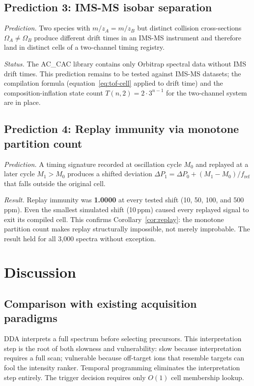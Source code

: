 \documentclass[twocolumn,10pt,a4paper]{article}
\theoremstyle{thmstyle}
\theoremstyle{definition}
\theoremstyle{remark}
\newcommand{\DP}{\Delta P}
\newcommand{\fref}{f_{\mathrm{ref}}}
\begin{document}
\subsection{Prediction 3: IMS-MS isobar separation}

\emph{Prediction.} Two species with $m/z_A = m/z_B$ but distinct
collision cross-sections $\Omega_A \neq \Omega_B$ produce different
drift times in an IMS-MS instrument and therefore land in distinct cells
of a two-channel timing registry.

\emph{Status.} The AC\_CAC library contains only Orbitrap spectral data
without IMS drift times. This prediction remains to be tested against
IMS-MS datasets; the compilation formula (equation~\eqref{eq:tof-cell}
applied to drift time) and the composition-inflation state count
$T(n,2) = 2 \cdot 3^{n-1}$ for the two-channel system are in place.

\subsection{Prediction 4: Replay immunity via monotone partition count}

\emph{Prediction.} A timing signature recorded at oscillation cycle $M_0$
and replayed at a later cycle $M_1 > M_0$ produces a shifted deviation
$\DP_1 = \DP_0 + (M_1 - M_0)/\fref$ that falls outside the original cell.

\emph{Result.} Replay immunity was \textbf{1.0000} at every tested shift
(10, 50, 100, and 500\,ppm). Even the smallest simulated shift (10\,ppm)
caused every replayed signal to exit its compiled cell. This confirms
Corollary~\ref{cor:replay}: the monotone partition count makes replay
structurally impossible, not merely improbable. The result held for all
3{,}000 spectra without exception.

\section{Discussion}
\label{sec:discussion}

\subsection{Comparison with existing acquisition paradigms}

DDA interprets a full spectrum before selecting precursors. This
interpretation step is the root of both slowness and vulnerability:
slow because interpretation requires a full scan; vulnerable because
off-target ions that resemble targets can fool the intensity ranker.
Temporal programming eliminates the interpretation step entirely.
The trigger decision requires only $O(1)$ cell membership lookup.
\end{document}
